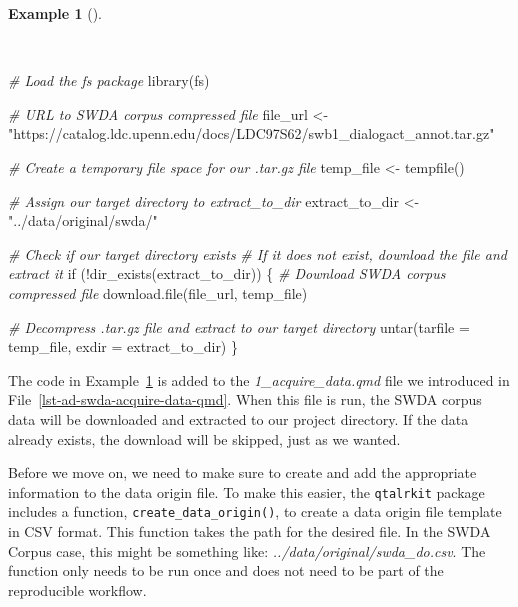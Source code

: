 \documentclass[
  letterpaper,
  DIV=11,
  numbers=noendperiod]{scrreport}
\newenvironment{Shaded}{\begin{snugshade}}{\end{snugshade}}
\newcommand{\AttributeTok}[1]{\textcolor[rgb]{0.00,0.00,0.00}{#1}}
\newcommand{\CommentTok}[1]{\textcolor[rgb]{0.00,0.00,0.00}{\textit{#1}}}
\newcommand{\ControlFlowTok}[1]{\textcolor[rgb]{0.00,0.00,0.00}{#1}}
\newcommand{\FunctionTok}[1]{\textcolor[rgb]{0.00,0.00,0.00}{#1}}
\newcommand{\NormalTok}[1]{\textcolor[rgb]{0.00,0.00,0.00}{#1}}
\newcommand{\OtherTok}[1]{\textcolor[rgb]{0.00,0.00,0.00}{#1}}
\newcommand{\SpecialCharTok}[1]{\textcolor[rgb]{0.00,0.00,0.00}{#1}}
\newcommand{\StringTok}[1]{\textcolor[rgb]{0.00,0.00,0.00}{#1}}
\theoremstyle{definition}
\newtheorem{example}{Example}[chapter]
\theoremstyle{remark}
\begin{document}
\begin{example}[]\protect\hypertarget{exm-ad-swda-if-dir-exists}{}\label{exm-ad-swda-if-dir-exists}

~

\begin{Shaded}
\begin{Highlighting}[]
\CommentTok{\# Load the \textasciigrave{}fs\textasciigrave{} package}
\FunctionTok{library}\NormalTok{(fs)}

\CommentTok{\# URL to SWDA corpus compressed file}
\NormalTok{file\_url }\OtherTok{\textless{}{-}} 
  \StringTok{"https://catalog.ldc.upenn.edu/docs/LDC97S62/swb1\_dialogact\_annot.tar.gz"}

\CommentTok{\# Create a temporary file space for our .tar.gz file}
\NormalTok{temp\_file }\OtherTok{\textless{}{-}} \FunctionTok{tempfile}\NormalTok{()}

\CommentTok{\# Assign our target directory to \textasciigrave{}extract\_to\_dir\textasciigrave{}}
\NormalTok{extract\_to\_dir }\OtherTok{\textless{}{-}} \StringTok{"../data/original/swda/"}

\CommentTok{\# Check if our target directory exists}
\CommentTok{\# If it does not exist, download the file and extract it}
\ControlFlowTok{if}\NormalTok{ (}\SpecialCharTok{!}\FunctionTok{dir\_exists}\NormalTok{(extract\_to\_dir)) \{}
  \CommentTok{\# Download SWDA corpus compressed file}
  \FunctionTok{download.file}\NormalTok{(file\_url, temp\_file)}
  
  \CommentTok{\# Decompress .tar.gz file and extract to our target directory}
  \FunctionTok{untar}\NormalTok{(}\AttributeTok{tarfile =}\NormalTok{ temp\_file, }\AttributeTok{exdir =}\NormalTok{ extract\_to\_dir)}
\NormalTok{\}}
\end{Highlighting}
\end{Shaded}

\end{example}

The code in Example~\ref{exm-ad-swda-if-dir-exists} is added to the
\emph{1\_acquire\_data.qmd} file we introduced in
File~\ref{lst-ad-swda-acquire-data-qmd}. When this file is run, the SWDA
corpus data will be downloaded and extracted to our project directory.
If the data already exists, the download will be skipped, just as we
wanted.

Before we move on, we need to make sure to create and add the
appropriate information to the data origin file. To make this easier,
the \texttt{qtalrkit} package includes a function,
\texttt{create\_data\_origin()}, to create a data origin file template
in CSV format. This function takes the path for the desired file. In the
SWDA Corpus case, this might be something like:
\emph{../data/original/swda\_do.csv}. The function only needs to be run
once and does not need to be part of the reproducible workflow.
\end{document}
